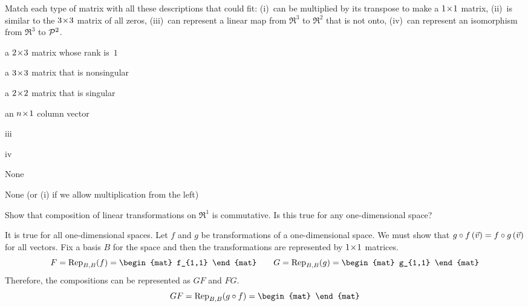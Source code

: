 \begin{exercises}
    \cite{Cleary}
    Match each type of matrix with all these descriptions that could fit:
    (i)~can be multiplied by its transpose to make a $1 \! \times \! 1$ matrix, 
    (ii)~is similar to the $3 \! \times \! 3$ matrix of all zeros,
    (iii)~can represent a linear map from $\Re^3$ to $\Re^2$ that is not onto,
    (iv)~can represent an isomorphism from $\Re^3$ to $\mathcal{P}^2$.
    \begin{exparts}
      \item a $2 \! \times \! 3$ matrix whose rank is~$1$ 
      \item a $3 \! \times \! 3$ matrix that is nonsingular         
      \item a $2 \! \times \! 2$ matrix that is singular
      \item an $n \! \times \! 1$ column vector 
    \end{exparts}
    \begin{answer}
      \begin{exparts}
        \item iii
        \item iv
        \item None
        \item None (or (i) if we allow multiplication from the left)
      \end{exparts}
    \end{answer}
  \item  
    Show that composition of linear transformations on \( \Re^1 \) is
    commutative.
    Is this true for any one-dimensional space?
    \begin{answer}
      It is true for all one-dimensional spaces.
      Let $f$ and $g$ be transformations of a one-dimensional space.
      We must show that 
      $g\mathbin\circ f\,(\vec{v})=f\mathbin\circ g\,(\vec{v})$
      for all vectors.
      Fix a basis $B$ for the space and then the transformations are 
      represented by $1 \! \times \! 1$ matrices.
      \begin{equation*}
        F=\rep{f}{B,B}=\begin{mat}
                        f_{1,1}
                     \end{mat}
        \qquad
        G=\rep{g}{B,B}=\begin{mat}
                        g_{1,1}
                     \end{mat}
      \end{equation*}
      Therefore, the compositions can be represented as $GF$ and $FG$.
      \begin{equation*}
        GF=\rep{\composed{g}{f}}{B,B}=\begin{mat}

\end{mat}
\end{equation*}
\end{answer}
\end{exercises}
